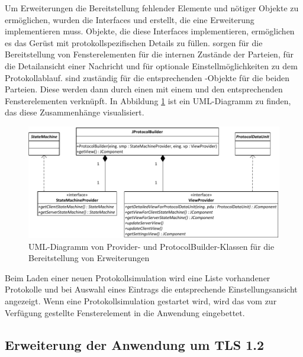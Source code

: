 
Um Erweiterungen die Bereitstellung fehlender Elemente und nötiger Objekte zu ermöglichen, wurden die Interfaces  und  erstellt, die eine Erweiterung implementieren muss. Objekte, die diese Interfaces implementieren, ermöglichen es das Gerüst mit protokollspezifischen Details zu füllen.  sorgen für die Bereitstellung von Fensterelementen für die internen Zustände der Parteien, für die Detailansicht einer Nachricht und für optionale Einstellmöglichkeiten zu dem Protokollablauf.  sind zuständig für die entsprechenden -Objekte für die beiden Parteien. Diese werden dann durch einen  mit einem  und den entsprechenden Fensterelementen verknüpft. In Abbildung \ref{fig_uml_abstract_provider_builder} ist ein UML-Diagramm zu finden, das diese Zusammenhänge visualisiert. 

\begin{figure}
	\centering
	\includegraphics[scale=0.9]{Diagrams/uml/abstract_provider_builder.pdf} %
	\caption{UML-Diagramm von Provider- und ProtocolBuilder-Klassen für die Bereitstellung von Erweiterungen}
	\label{fig_uml_abstract_provider_builder}
\end{figure}

Beim Laden einer neuen Protokollsimulation wird eine Liste vorhandener Protokolle und bei Auswahl eines Eintrags die entsprechende Einstellungsansicht angezeigt. Wenn eine Protokollsimulation gestartet wird, wird das vom  zur Verfügung gestellte Fensterelement in die Anwendung eingebettet.

\subsection{Erweiterung der Anwendung um TLS 1.2}

